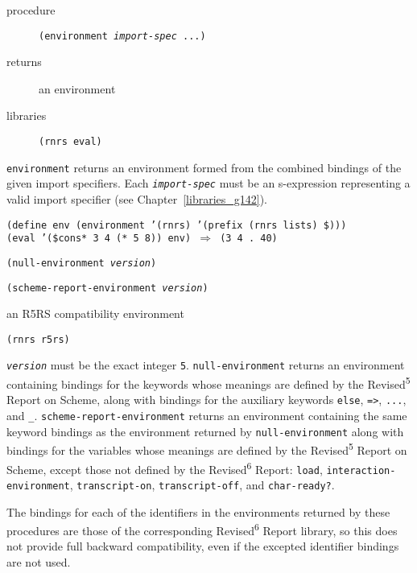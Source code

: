 \begin{description}

\label{control_s81}\item[procedure] \texttt{(environment \textit{import-spec} ...)}



\item[returns] an environment


\item[libraries] \texttt{(rnrs eval)}
\end{description}

\texttt{environment} returns an environment formed from the combined
bindings of the given import specifiers.
Each \texttt{\textit{import-spec}} must be an s-expression representing a valid
import specifier (see Chapter \ref{libraries_g142}).

\begin{alltt}
(define env (environment '(rnrs) '(prefix (rnrs lists) \${})))
(eval '(\${}cons* 3 4 (* 5 8)) env) \(\Rightarrow\) (3 4 . 40)
\end{alltt}

\begin{description}

\label{control_s82}\item[procedure] \texttt{(null-environment \textit{version})}



\item[procedure] \texttt{(scheme-report-environment \textit{version})}



\item[returns] an R5RS compatibility environment


\item[libraries] \texttt{(rnrs r5rs)}
\end{description}

\texttt{\textit{version}} must be the exact integer \texttt{5}.
\texttt{null-environment} returns an environment containing
bindings for the keywords whose meanings are defined by the
Revised\textsuperscript{5} Report on Scheme, along with bindings for the
auxiliary keywords \texttt{else}, \texttt{=\textgreater{}}, \texttt{...},
and \texttt{\_{}}.
\texttt{scheme-report-environment} returns an environment containing
the same keyword bindings as the environment
returned by \texttt{null-environment} along with bindings for
the variables whose meanings are defined by the Revised\textsuperscript{5} Report on
Scheme, except those not defined by the Revised\textsuperscript{6} Report:
\texttt{load}, \texttt{interaction-environment},
\texttt{transcript-on}, \texttt{transcript-off}, and
\texttt{char-ready?}.

The bindings for each of the identifiers in the environments returned
by these procedures are those of the corresponding Revised\textsuperscript{6} Report
library, so this does not provide full backward compatibility, even if the
excepted identifier bindings are not used.


